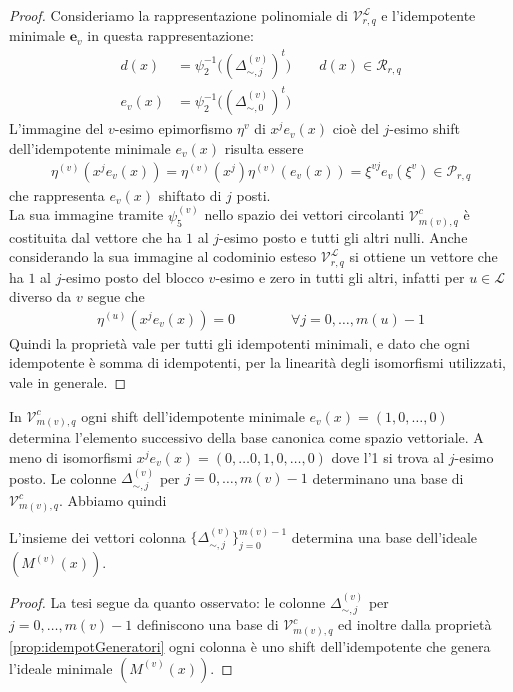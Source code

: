 \begin{proof}
   Consideriamo la rappresentazione polinomiale di $\mathcal{V}_{r, q}^{\mathscr{L}}$ e l'idempotente minimale $\mathbf{e}_{v}$ in questa rappresentazione:
   \begin{align*}
      d(x) &= \psi_{2}^{-1} \big( (\Delta_{\sim, j}^{(v)})^{t} \big) \qquad d(x) \in \mathcal{R}_{r,q} \\
      e_{v}(x) &= \psi_{2}^{-1} \big( (\Delta_{\sim, 0}^{(v)})^{t} \big)
   \end{align*}
   L'immagine del $v$-esimo epimorfismo $\eta^{v}$ di $x^{j}e_{v}(x)$ cioè del $j$-esimo shift dell'idempotente minimale $e_{v}(x)$ risulta essere
   \begin{align*}
      \eta^{(v)}(x^{j}e_{v}(x)) = \eta^{(v)}(x^{j}) \eta^{(v)}(e_{v}(x)) = \xi^{vj} e_{v}(\xi^{v}) \in \mathcal{P}_{r,q} 
   \end{align*}
   che rappresenta $e_{v}(x)$ shiftato di $j$ posti.\\
   La sua immagine tramite $\psi_{5}^{(v)}$ nello spazio dei vettori circolanti $\mathcal{V}_{m(v), q}^{c}$ è costituita dal vettore che ha $1$ al $j$-esimo posto e tutti gli altri nulli.
   Anche considerando la sua immagine al codominio esteso $\mathcal{V}_{r, q}^{\mathscr{L}}$ si ottiene un vettore che ha $1$ al $j$-esimo posto del blocco $v$-esimo e zero in tutti gli altri, infatti per $u \in \mathscr{L}$ diverso da $v$ segue che
   \begin{align*}
      \eta^{(u)}(x^{j}e_{v}(x)) = 0 \qquad \qquad \forall j =0, \dots, m(u) - 1
   \end{align*}
   Quindi la proprietà vale per tutti gli idempotenti minimali, e dato che ogni idempotente è somma di idempotenti, per la linearità degli isomorfismi utilizzati, vale in generale.
\end{proof}

In $\mathcal{V}_{m(v), q}^{c}$ ogni shift dell'idempotente minimale $e_{v}(x) = (1,0,\dots , 0)$ determina l'elemento successivo della base canonica come spazio vettoriale. A meno di isomorfismi $x^{j}e_{v}(x) = (0,\dots 0,1,0,\dots , 0)$ dove l'1 si trova al $j$-esimo posto. Le colonne $\Delta_{\sim, j}^{(v)}$ per $j=0, \dots , m(v)-1$ determinano una base di $\mathcal{V}_{m(v), q}^{c}$. Abbiamo quindi
\begin{prop}
   L'insieme dei vettori colonna $\lbrace \Delta_{\sim, j}^{(v)} \rbrace_{j=0}^{m(v)-1}$ determina una base dell'ideale $(M^{(v)}(x))$.
\end{prop}
\begin{proof}
   La tesi segue da quanto osservato: le colonne $\Delta_{\sim, j}^{(v)}$ per $j=0, \dots , m(v)-1$ definiscono una base di $\mathcal{V}_{m(v), q}^{c}$ ed inoltre dalla proprietà \ref{prop:idempotGeneratori} ogni colonna è uno shift dell'idempotente che genera l'ideale minimale $(M^{(v)}(x))$.  
\end{proof}

